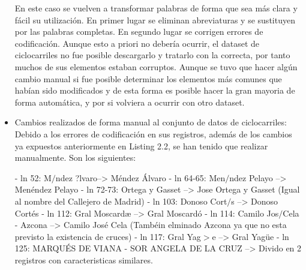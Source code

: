 \begin{itemize}


En este caso se vuelven a transformar palabras de forma que sea más clara y fácil su utilización.
En primer lugar se eliminan abreviaturas y se sustituyen por las palabras completas.
\newline
En segundo lugar se corrigen errores de codificación. Aunque esto a priori no debería ocurrir, el dataset de ciclocarriles no fue posible descargarlo y tratarlo con la correcta, por tanto muchos de sus elementos estaban corruptos. Aunque se tuvo que hacer algún cambio manual si fue posible determinar los elementos más comunes que habían sido modificados y de esta forma es posible hacer la gran mayoria de forma automática, y por si volviera a ocurrir con otro dataset.
\newline


  \item Cambios realizados de forma manual al conjunto de datos de ciclocarriles:
\newline
\newline
Debido a los errores de codificación en sus registros, además de los cambios ya expuestos anteriormente en Listing 2.2, se han tenido que realizar manualmente. Son los siguientes:
\begin{tiny}
\newline - ln 52: M$/$ndez ?lvaro--> Méndez Álvaro
\newline - ln 64-65: Men$/$ndez Pelayo --> Menéndez Pelayo
\newline - ln 72-73: Ortega y Gasset --> Jose Ortega y Gasset (Igual al nombre del Callejero de Madrid)
\newline - ln 103: Donoso Cort$/$s --> Donoso Cortés
\newline - ln 112: Gral Moscardæ --> Gral Moscardó
\newline - ln 114: Camilo Jos$/$Cela - Azcona --> Camilo José Cela (Tambéin elminado Azcona ya que no esta previsto la existencia de cruces)
\newline - ln 117: Gral Yag$>$e --> Gral Yagüe
\newline - ln 125: MARQUÉS DE VIANA - SOR ANGELA DE LA CRUZ --> Divido en 2 registros con caracteristicas similares.
\newline
\end{tiny}


\end{itemize}
